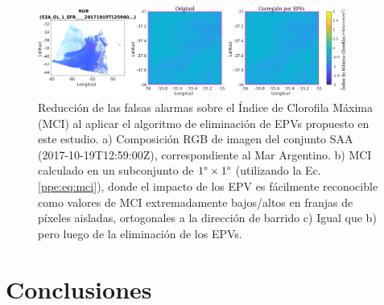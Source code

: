     \begin{figure}
    \centering
    \includegraphics[width=0.9\textwidth]{ppe/figures/ppeMci}
    \caption[Reducción de las falsas alarmas sobre MCI al aplicar el algoritmo de eliminación de EPVs propuesto en este estudio.]{Reducción de las falsas alarmas sobre el Índice de Clorofila Máxima (MCI) al aplicar el algoritmo de eliminación de EPVs propuesto en este estudio. a) Composición RGB de imagen del conjunto SAA (2017-10-19T12:59:00Z), correspondiente al Mar Argentino. b) MCI calculado en un subconjunto de $1\degree \times 1\degree$ (utilizando la Ec. \ref{ppe:eq:mci}), donde el impacto de los EPV es fácilmente reconocible como valores de MCI extremadamente bajos/altos en franjas de píxeles aisladas, ortogonales a la dirección de barrido c) Igual que b) pero luego de la eliminación de los EPVs.}
    \label{ppe:ppeMci}
    \end{figure}

\section{Conclusiones}
\label{ppe:s:conclusion}

